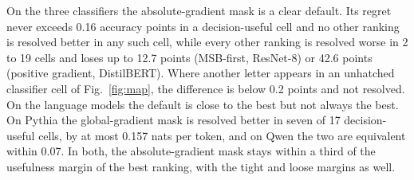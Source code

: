 On the three classifiers the absolute-gradient mask is a clear default. Its regret never exceeds 0.16 accuracy points in a decision-useful cell and no other ranking is resolved better in any such cell, while every other ranking is resolved worse in 2 to 19 cells and loses up to 12.7 points (MSB-first, ResNet-8) or 42.6 points (positive gradient, DistilBERT). Where another letter appears in an unhatched classifier cell of Fig.~\ref{fig:map}, the difference is below 0.2 points and not resolved. On the language models the default is close to the best but not always the best. On Pythia the global-gradient mask is resolved better in seven of 17 decision-useful cells, by at most 0.157 nats per token, and on Qwen the two are equivalent within 0.07. In both, the absolute-gradient mask stays within a third of the usefulness margin of the best ranking, with the tight and loose margins as well.

